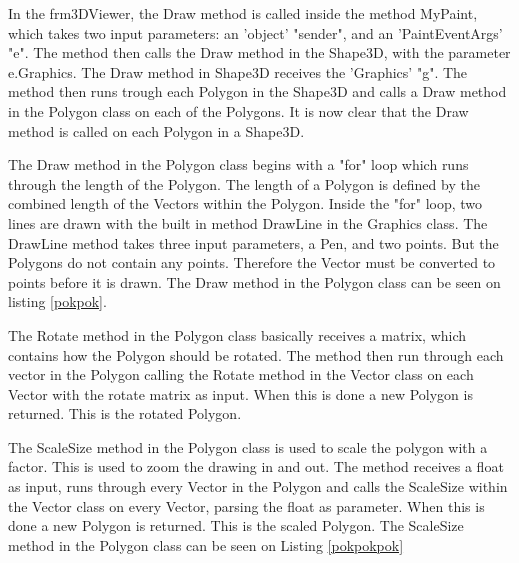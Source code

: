 In the frm3DViewer, the Draw method is called inside the method MyPaint, which takes two input parameters: an 'object' "sender", and an 'PaintEventArgs' "e". The method then calls the Draw method in the Shape3D, with the parameter e.Graphics. The Draw method in Shape3D receives the 'Graphics' "g". The method then runs trough each Polygon in the Shape3D and calls a Draw method in the Polygon class on each of the Polygons. It is now clear that the Draw method is called on each Polygon in a Shape3D.

The Draw method in the Polygon class begins with a "for" loop which runs through the length of the Polygon. The length of a Polygon is defined by the combined length of the Vectors within the Polygon. Inside the "for" loop, two lines are drawn with the built in method DrawLine in the Graphics class. The DrawLine method takes three input parameters, a Pen, and two points. But the Polygons do not contain any points. Therefore the Vector must be converted to points before it is drawn. The Draw method in the Polygon class can be seen on listing \ref{pokpok}. 

The Rotate method in the Polygon class basically receives a matrix, which contains how the Polygon should be rotated. The method then run through each vector in the Polygon calling the Rotate method in the Vector class on each Vector with the rotate matrix as input. When this is done a new Polygon is returned. This is the rotated Polygon.

The ScaleSize method in the Polygon class is used to scale the polygon with a factor. This is used to zoom the drawing in and out. The method receives a float as input, runs through every Vector in the Polygon and calls the ScaleSize within the Vector class on every Vector, parsing the float as parameter.  When this is done a new Polygon is returned. This is the scaled Polygon. The ScaleSize method in the Polygon class can be seen on Listing \ref{pokpokpok}

